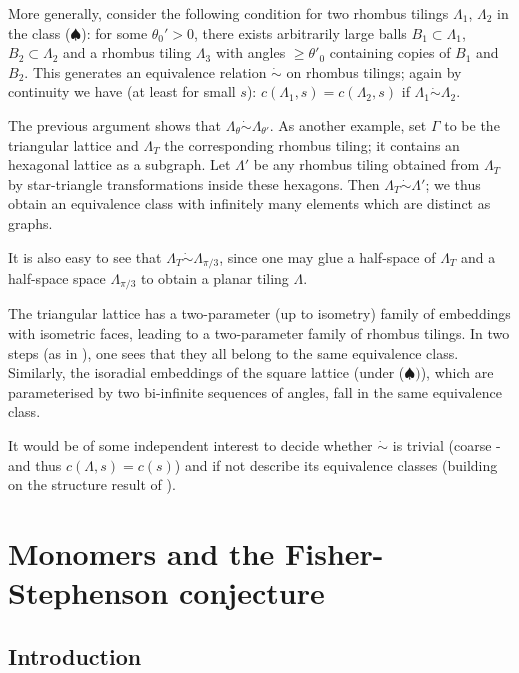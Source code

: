 \documentclass[10pt]{article}
\begin{document}
More generally, consider the following condition for two rhombus tilings $\Lambda_1$, $\Lambda_2$ in the class ($\spadesuit$): for some $\theta_0'>0$, there exists arbitrarily large balls $B_1\subset\Lambda_1$, $B_2\subset\Lambda_2$ and a rhombus tiling $\Lambda_3$  with angles $\geq\theta'_0$ containing copies of $B_1$ and $B_2$. This generates an equivalence relation $\dot\sim$ on rhombus tilings; again by continuity we have (at least for small $s$): $c(\Lambda_1,s)=c(\Lambda_2,s)$ if $\Lambda_1\dot\sim\Lambda_2$. 

The previous argument shows that $\Lambda_\theta\dot\sim\Lambda_{\theta'}$. As another example, set $\Gamma$ to be the triangular lattice and $\Lambda_T$ the corresponding rhombus tiling; it contains an hexagonal lattice as a subgraph. Let $\Lambda'$ be any rhombus tiling obtained from $\Lambda_T$ by star-triangle transformations inside these hexagons. Then $\Lambda_T\dot\sim\Lambda'$; we thus obtain an equivalence class with infinitely many elements which are distinct as graphs. 

It is also easy to see that $\Lambda_T\dot\sim \Lambda_{\pi/3}$, since one may glue a half-space of $\Lambda_T$ and a half-space space $\Lambda_{\pi/3}$ to obtain a planar tiling $\Lambda$.

The triangular lattice has a two-parameter (up to isometry) family of embeddings with isometric faces, leading to a two-parameter family of rhombus tilings. In two steps (as in \cite{GriMan_inhom}), one sees that they all belong to the same equivalence class. Similarly, the isoradial embeddings of the square lattice (under ($\spadesuit)$), which are parameterised by two bi-infinite sequences of angles, fall in the same equivalence class.

It would be of some independent interest to decide whether $\dot\sim$ is trivial (coarse - and thus $c(\Lambda,s)=c(s)$) and if not describe its equivalence classes (building on the structure result of \cite{KenSch}).

%
%
%
%
%
%
%
%






\section{Monomers and the Fisher-Stephenson conjecture}\label{sec:mono}


\subsection{Introduction}\label{ssec:FSintro}
\end{document}
